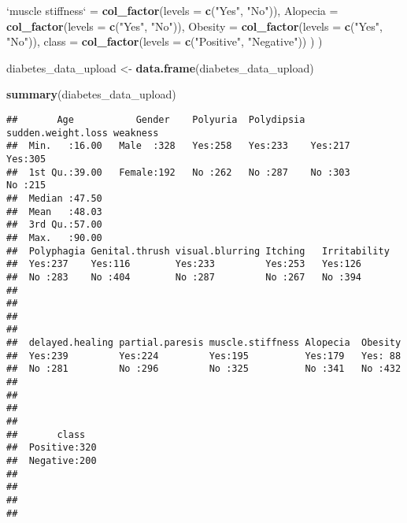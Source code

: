 \documentclass[
]{article}
\newenvironment{Shaded}{}{}
\newcommand{\DataTypeTok}[1]{\textcolor[rgb]{0.56,0.13,0.00}{#1}}
\newcommand{\KeywordTok}[1]{\textcolor[rgb]{0.00,0.44,0.13}{\textbf{#1}}}
\newcommand{\NormalTok}[1]{#1}
\newcommand{\StringTok}[1]{\textcolor[rgb]{0.25,0.44,0.63}{#1}}
\begin{document}
\begin{Shaded}
\begin{Highlighting}[]
    \StringTok{`}\DataTypeTok{muscle stiffness}\StringTok{`}\NormalTok{ =}\StringTok{ }\KeywordTok{col_factor}\NormalTok{(}\DataTypeTok{levels =} \KeywordTok{c}\NormalTok{(}\StringTok{"Yes"}\NormalTok{, }\StringTok{"No"}\NormalTok{)),}
    \DataTypeTok{Alopecia =} \KeywordTok{col_factor}\NormalTok{(}\DataTypeTok{levels =} \KeywordTok{c}\NormalTok{(}\StringTok{"Yes"}\NormalTok{, }\StringTok{"No"}\NormalTok{)),}
    \DataTypeTok{Obesity =} \KeywordTok{col_factor}\NormalTok{(}\DataTypeTok{levels =} \KeywordTok{c}\NormalTok{(}\StringTok{"Yes"}\NormalTok{, }\StringTok{"No"}\NormalTok{)),}
    \DataTypeTok{class =} \KeywordTok{col_factor}\NormalTok{(}\DataTypeTok{levels =} \KeywordTok{c}\NormalTok{(}\StringTok{"Positive"}\NormalTok{, }\StringTok{"Negative"}\NormalTok{))}
\NormalTok{  )}
\NormalTok{)}

\NormalTok{diabetes_data_upload <-}\StringTok{ }\KeywordTok{data.frame}\NormalTok{(diabetes_data_upload)}

\KeywordTok{summary}\NormalTok{(diabetes_data_upload)}
\end{Highlighting}
\end{Shaded}

\begin{verbatim}
##       Age           Gender    Polyuria  Polydipsia sudden.weight.loss weakness 
##  Min.   :16.00   Male  :328   Yes:258   Yes:233    Yes:217            Yes:305  
##  1st Qu.:39.00   Female:192   No :262   No :287    No :303            No :215  
##  Median :47.50                                                                 
##  Mean   :48.03                                                                 
##  3rd Qu.:57.00                                                                 
##  Max.   :90.00                                                                 
##  Polyphagia Genital.thrush visual.blurring Itching   Irritability
##  Yes:237    Yes:116        Yes:233         Yes:253   Yes:126     
##  No :283    No :404        No :287         No :267   No :394     
##                                                                  
##                                                                  
##                                                                  
##                                                                  
##  delayed.healing partial.paresis muscle.stiffness Alopecia  Obesity  
##  Yes:239         Yes:224         Yes:195          Yes:179   Yes: 88  
##  No :281         No :296         No :325          No :341   No :432  
##                                                                      
##                                                                      
##                                                                      
##                                                                      
##       class    
##  Positive:320  
##  Negative:200  
##                
##                
##                
## 
\end{verbatim}
\end{document}
